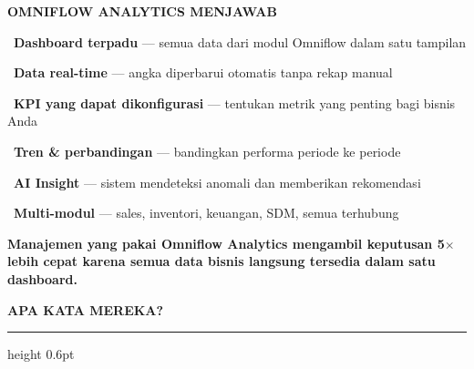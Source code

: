 \documentclass[a4paper]{article}
\newcommand{\sectiontitle}[1]{%
    \vspace{10pt}%
    {\fontsize{13}{16}\selectfont\bfseries\color{BlueDark} #1}\par\vspace{3pt}%
    {\color{BluePrimary}\hrule height 0.6pt}\par\vspace{8pt}%
}
\begin{document}
\begin{minipage}[t]{0.485\textwidth}
    \colorbox{IndigoPrimary}{%
        \begin{minipage}{\dimexpr\textwidth-2\fboxsep\relax}
            {\fontsize{10}{13}\selectfont\bfseries\color{White} OMNIFLOW ANALYTICS MENJAWAB}
        \end{minipage}}\par
    \vspace{4pt}

    {\fontsize{9.5}{13}\selectfont\color{TextDark}%
    \textbullet\ \textbf{Dashboard terpadu} --- semua data dari modul Omniflow dalam satu tampilan\par\vspace{4pt}%
    \textbullet\ \textbf{Data real-time} --- angka diperbarui otomatis tanpa rekap manual\par\vspace{4pt}%
    \textbullet\ \textbf{KPI yang dapat dikonfigurasi} --- tentukan metrik yang penting bagi bisnis Anda\par\vspace{4pt}%
    \textbullet\ \textbf{Tren \& perbandingan} --- bandingkan performa periode ke periode\par\vspace{4pt}%
    \textbullet\ \textbf{AI Insight} --- sistem mendeteksi anomali dan memberikan rekomendasi\par\vspace{4pt}%
    \textbullet\ \textbf{Multi-modul} --- sales, inventori, keuangan, SDM, semua terhubung}%
\end{minipage}

\vspace{8pt}

{\setlength{\fboxsep}{7pt}\setlength{\fboxrule}{0pt}%
\noindent\colorbox{IndigoPrimary}{%
    \begin{minipage}{\dimexpr\textwidth-2\fboxsep\relax}
        \centering
        {\fontsize{9.5}{12}\selectfont\bfseries\color{White}
        Manajemen yang pakai Omniflow Analytics mengambil keputusan \textbf{5$\times$ lebih cepat} karena semua data bisnis langsung tersedia dalam satu dashboard.}
    \end{minipage}}}

\vspace{8pt}
\sectiontitle{APA KATA MEREKA?}
\end{document}
